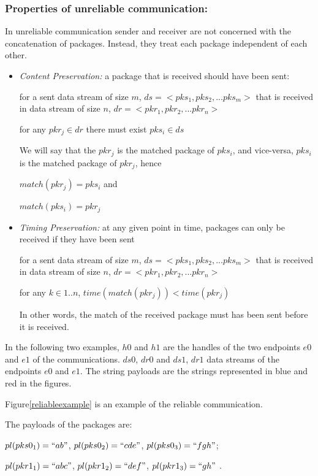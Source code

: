 \subsubsection{Properties of unreliable communication:}
In unreliable communication sender and receiver are not concerned with the concatenation of packages. Instead, they treat each package independent of each other.
\begin{itemize}
 \item \textit{ Content Preservation:} a package that is received should have been sent:

for a sent data stream of size $m$, $ds= <pks_1, pks_2, ... pks_m>$ that is received in data stream  of size $n$, $dr = <pkr_1, pkr_2, ... pkr_n>$

for any $pkr_j \in dr$ there must exist $pks_i \in ds$

We will say that the $pkr_j$ is the matched package of $pks_i$, and vice-versa, $pks_i$ is the matched package of $pkr_j$, hence

$match(pkr_j) = pks_i$  and

$match(pks_i) = pkr_j$

 \item \textit{Timing Preservation:}  at any given point in time, packages can only be received if they have been sent

  for a sent data stream of size $m$, $ds= <pks_1, pks_2, ... pks_m>$ that is received in data stream of size $n$, $dr = <pkr_1, pkr_2, ... pkr_n>$

  for any $k \in {1..n}$, $time(match(pkr_j)) < time(pkr_j)$

In other words, the match of the received package must has been sent before it is received.

\end{itemize}



In the following two examples, $h0$ and $h1$ are the handles of the two endpoints $e0$ and $e1$ of the communications. $ds0$, $dr0$ and $ds1$, $dr1$ data streams of the endpoints $e0$ and $e1$. The string payloads are the strings represented in blue and red in the figures. 

Figure\ref{reliableexample} is an example of the reliable communication. 

The payloads of the packages are:

$pl(pks0_1)=``ab"$, $ pl(pks0_2)=``cde"$, $pl(pks0_3)=``fgh"$;

$pl(pkr1_1)=``abc"$, $pl(pkr1_2)=``def"$, $pl(pkr1_3)=``gh"$ .

